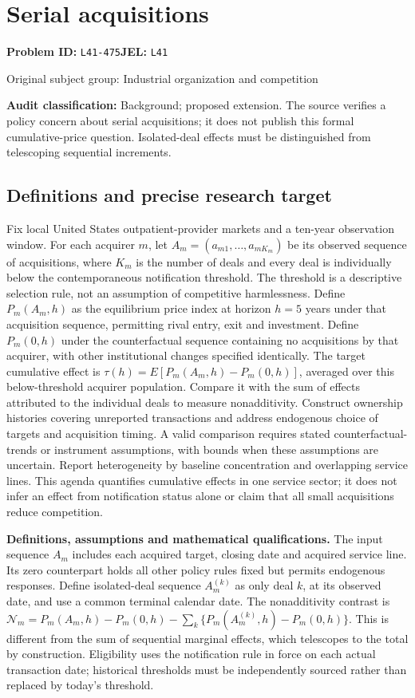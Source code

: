 \documentclass[11pt,a4paper]{article}
\begin{document}
\section*{Serial acquisitions}
\textbf{Problem ID:} \texttt{L41-475}\quad \textbf{JEL:} \texttt{L41}\par
\label{problem:OP-0395}
{\sffamily\small\color{muted}Original subject group: Industrial organization and competition\par}
\label{definitions:problem:30007677}
\textbf{Audit classification:} Background; proposed extension. The source verifies a policy concern about serial acquisitions; it does not publish this formal cumulative-price question. Isolated-deal effects must be distinguished from telescoping sequential increments.
\subsection*{Definitions and precise research target}
Fix local United States outpatient-provider markets and a ten-year observation window. For each acquirer \(m\), let \(A_m=(a_{m1},\ldots,a_{mK_m})\) be its observed sequence of acquisitions, where \(K_m\) is the number of deals and every deal is individually below the contemporaneous notification threshold. The threshold is a descriptive selection rule, not an assumption of competitive harmlessness. Define \(P_m(A_m,h)\) as the equilibrium price index at horizon \(h=5\) years under that acquisition sequence, permitting rival entry, exit and investment. Define \(P_m(0,h)\) under the counterfactual sequence containing no acquisitions by that acquirer, with other institutional changes specified identically. The target cumulative effect is \(\tau(h)=E[P_m(A_m,h)-P_m(0,h)]\), averaged over this below-threshold acquirer population. Compare it with the sum of effects attributed to the individual deals to measure nonadditivity. Construct ownership histories covering unreported transactions and address endogenous choice of targets and acquisition timing. A valid comparison requires stated counterfactual-trends or instrument assumptions, with bounds when these assumptions are uncertain. Report heterogeneity by baseline concentration and overlapping service lines. This agenda quantifies cumulative effects in one service sector; it does not infer an effect from notification status alone or claim that all small acquisitions reduce competition.

\textbf{Definitions, assumptions and mathematical qualifications.} The input sequence \(A_m\) includes each acquired target, closing date and acquired service line. Its zero counterpart holds all other policy rules fixed but permits endogenous responses. Define isolated-deal sequence \(A_m^{(k)}\) as only deal \(k\), at its observed date, and use a common terminal calendar date. The nonadditivity contrast is \(\mathcal N_m=P_m(A_m,h)-P_m(0,h)-\sum_k\{P_m(A_m^{(k)},h)-P_m(0,h)\}\). This is different from the sum of sequential marginal effects, which telescopes to the total by construction. Eligibility uses the notification rule in force on each actual transaction date; historical thresholds must be independently sourced rather than replaced by today's threshold.
\end{document}

